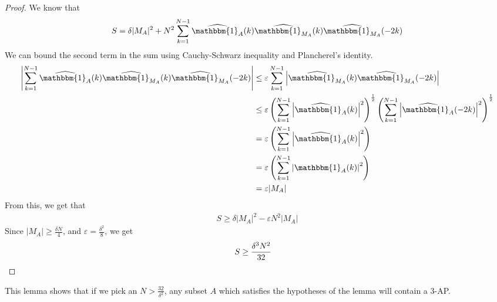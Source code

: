 \documentclass[12pt, titlepage]{article}
\theoremstyle{definition}
\newcommand{\vep}{\varepsilon}
\newcommand{\indi}{\mathbbm{1}}
\begin{document}
\begin{proof}
    We know that
    \begin{align*}
        S = \delta |M_A|^2 + N^2 \sum_{k=1}^{N-1} \widehat{\indi_A}(k) \widehat{\indi_{M_A}}(k) \widehat{\indi_{M_A}}(-2k)
    \end{align*}
    We can bound the second term in the sum using Cauchy-Schwarz inequality and Plancherel's identity.
    \begin{align*}
        \left| \sum_{k=1}^{N-1} \widehat{\indi_A}(k) \widehat{\indi_{M_A}}(k) \widehat{\indi_{M_A}}(-2k) \right|
        &\leq \vep \sum_{k=1}^{N-1}\left| \widehat{\indi_{M_A}}(k) \widehat{\indi_{M_A}}(-2k) \right| \\
        &\leq \vep \left( \sum_{k=1}^{N-1} \left| \widehat{\indi_A}(k) \right|^2 \right)^{\frac{1}{2}} \left( \sum_{k=1}^{N-1} \left| \widehat{\indi_A}(-2k) \right|^2 \right)^{\frac{1}{2}} \\
        &= \vep \left( \sum_{k=1}^{N-1} \left| \widehat{\indi_A}(k) \right|^2 \right) \\
        &= \vep \left( \sum_{k=1}^{N-1} \left| \indi_A(k) \right|^2 \right) \\
        &= \vep |M_A|
    \end{align*}
    From this, we get that
    \begin{align*}
        S \geq \delta |M_A|^2 - \vep N^2 |M_A|
    \end{align*}
    Since $|M_A| \geq \frac{\delta N}{4}$, and $\vep = \frac{\delta^2}{8}$, we get
    \begin{align*}
        S \geq \frac{\delta^3 N^2}{32} &\qedhere
    \end{align*}
\end{proof}
This lemma shows that if we pick an $N > \frac{32}{\delta^2}$, any subset $A$ which satisfies the hypotheses of the lemma will contain a $3$-AP.
\end{document}
